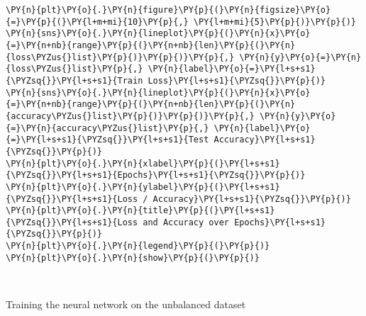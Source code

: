     \begin{tcolorbox}[breakable, size=fbox, boxrule=1pt, pad at break*=1mm,colback=cellbackground, colframe=cellborder]
\begin{Verbatim}[commandchars=\\\{\}]
\PY{n}{plt}\PY{o}{.}\PY{n}{figure}\PY{p}{(}\PY{n}{figsize}\PY{o}{=}\PY{p}{(}\PY{l+m+mi}{10}\PY{p}{,} \PY{l+m+mi}{5}\PY{p}{)}\PY{p}{)}
\PY{n}{sns}\PY{o}{.}\PY{n}{lineplot}\PY{p}{(}\PY{n}{x}\PY{o}{=}\PY{n+nb}{range}\PY{p}{(}\PY{n+nb}{len}\PY{p}{(}\PY{n}{loss\PYZus{}list}\PY{p}{)}\PY{p}{)}\PY{p}{,} \PY{n}{y}\PY{o}{=}\PY{n}{loss\PYZus{}list}\PY{p}{,} \PY{n}{label}\PY{o}{=}\PY{l+s+s1}{\PYZsq{}}\PY{l+s+s1}{Train Loss}\PY{l+s+s1}{\PYZsq{}}\PY{p}{)}
\PY{n}{sns}\PY{o}{.}\PY{n}{lineplot}\PY{p}{(}\PY{n}{x}\PY{o}{=}\PY{n+nb}{range}\PY{p}{(}\PY{n+nb}{len}\PY{p}{(}\PY{n}{accuracy\PYZus{}list}\PY{p}{)}\PY{p}{)}\PY{p}{,} \PY{n}{y}\PY{o}{=}\PY{n}{accuracy\PYZus{}list}\PY{p}{,} \PY{n}{label}\PY{o}{=}\PY{l+s+s1}{\PYZsq{}}\PY{l+s+s1}{Test Accuracy}\PY{l+s+s1}{\PYZsq{}}\PY{p}{)}
\PY{n}{plt}\PY{o}{.}\PY{n}{xlabel}\PY{p}{(}\PY{l+s+s1}{\PYZsq{}}\PY{l+s+s1}{Epochs}\PY{l+s+s1}{\PYZsq{}}\PY{p}{)}
\PY{n}{plt}\PY{o}{.}\PY{n}{ylabel}\PY{p}{(}\PY{l+s+s1}{\PYZsq{}}\PY{l+s+s1}{Loss / Accuracy}\PY{l+s+s1}{\PYZsq{}}\PY{p}{)}
\PY{n}{plt}\PY{o}{.}\PY{n}{title}\PY{p}{(}\PY{l+s+s1}{\PYZsq{}}\PY{l+s+s1}{Loss and Accuracy over Epochs}\PY{l+s+s1}{\PYZsq{}}\PY{p}{)}
\PY{n}{plt}\PY{o}{.}\PY{n}{legend}\PY{p}{(}\PY{p}{)}
\PY{n}{plt}\PY{o}{.}\PY{n}{show}\PY{p}{(}\PY{p}{)}
\end{Verbatim}
\end{tcolorbox}

    \begin{center}
    \end{center}
    { \hspace*{\fill} \\}
    
    Training the neural network on the unbalanced dataset


